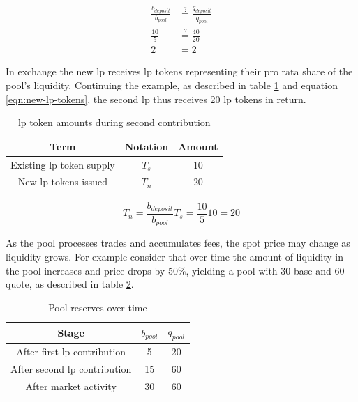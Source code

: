 \documentclass[table, twocolumn]{article}
\begin{document}
\begin{align} \label{eqn:new-lp-base-quote-ratios}
  \frac{b_{deposit}}{b_{pool}} & \stackrel{?}{=}
  \frac{q_{deposit}}{q_{pool}} \nonumber         \\
  \frac{10}{5}                 & \stackrel{?}{=}
  \frac{40}{20}  \nonumber                       \\
  2                            & = 2
\end{align}

In exchange the new \gls{lp} receives \gls{lp} tokens representing their pro rata share
of the pool's liquidity. Continuing the example, as described in table
\ref{tab:new-lp-tokens} and equation \ref{eqn:new-lp-tokens}, the second \gls{lp} thus
receives 20 \gls{lp} tokens in return.

\begin{table}[!htb]
  \centering
  \begin{tabular}{|c|c|c|}
    \hline \rowcolor{blue}
    Term                           & Notation & Amount \\ \hline
    Existing \gls{lp} token supply & $T_s$    & 10     \\ \hline
    New \gls{lp} tokens issued     & $T_n$    & 20     \\ \hline
  \end{tabular}
  \caption{\gls{lp} token amounts during second contribution}
  \label{tab:new-lp-tokens}
\end{table}

\begin{equation} \label{eqn:new-lp-tokens}
  T_n = \frac{b_{deposit}}{b_{pool}} T_s = \frac{10}{5} 10 = 20
\end{equation}

As the pool processes trades and accumulates fees, the spot price may change as
liquidity grows.  For example consider that over time the amount of liquidity in the
pool increases and price drops by 50\%, yielding a pool with 30 base and 60 quote, as
described in table \ref{tab:pool-reserve-progression}.

\begin{table}[!htb]
  \centering
  \begin{tabular}{|c|c|c|}
    \hline \rowcolor{blue}
    Stage                              & $b_{pool}$ & $q_{pool}$ \\ \hline
    After first \gls{lp} contribution  & 5          & 20         \\ \hline
    After second \gls{lp} contribution & 15         & 60         \\ \hline
    After market activity              & 30         & 60         \\ \hline
  \end{tabular}
  \caption{Pool reserves over time}
  \label{tab:pool-reserve-progression}
\end{table}
\end{document}
